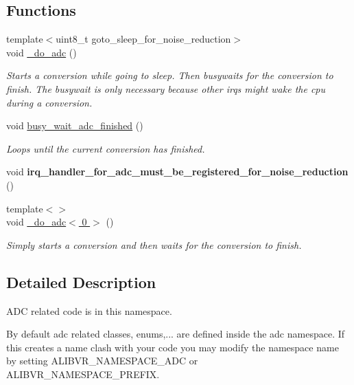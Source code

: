 \subsection*{Functions}
\begin{DoxyCompactItemize}
\item 
{\footnotesize template$<$uint8\+\_\+t goto\+\_\+sleep\+\_\+for\+\_\+noise\+\_\+reduction$>$ }\\void \hyperlink{namespaceadc_ab569dff590b3bb745fb012aa29ec5723}{\+\_\+do\+\_\+adc} ()
\begin{DoxyCompactList}\small\item\em Starts a conversion while going to sleep. Then busywaits for the conversion to finish. The busywait is only necessary because other irqs might wake the cpu during a conversion. \end{DoxyCompactList}\item 
\hypertarget{namespaceadc_a4228912d1c32eafc1987a8adb80f4984}{}\label{namespaceadc_a4228912d1c32eafc1987a8adb80f4984} 
void \hyperlink{namespaceadc_a4228912d1c32eafc1987a8adb80f4984}{busy\+\_\+wait\+\_\+adc\+\_\+finished} ()
\begin{DoxyCompactList}\small\item\em Loops until the current conversion has finished. \end{DoxyCompactList}\item 
\hypertarget{namespaceadc_a0f2e8fa37ba3e91fc9e7a58e3543eaaa}{}\label{namespaceadc_a0f2e8fa37ba3e91fc9e7a58e3543eaaa} 
void {\bfseries irq\+\_\+handler\+\_\+for\+\_\+adc\+\_\+must\+\_\+be\+\_\+registered\+\_\+for\+\_\+noise\+\_\+reduction} ()
\item 
{\footnotesize template$<$$>$ }\\void \hyperlink{namespaceadc_a6e0b185b550424440d92bc2b129f6128}{\+\_\+do\+\_\+adc$<$ 0 $>$} ()
\begin{DoxyCompactList}\small\item\em Simply starts a conversion and then waits for the conversion to finish. \end{DoxyCompactList}\end{DoxyCompactItemize}


\subsection{Detailed Description}
A\+DC related code is in this namespace. 

By default adc related classes, enums,... are defined inside the {\ttfamily adc} namespace. If this creates a name clash with your code you may modify the namespace name by setting A\+L\+I\+B\+V\+R\+\_\+\+N\+A\+M\+E\+S\+P\+A\+C\+E\+\_\+\+A\+DC or A\+L\+I\+B\+V\+R\+\_\+\+N\+A\+M\+E\+S\+P\+A\+C\+E\+\_\+\+P\+R\+E\+F\+IX. 

